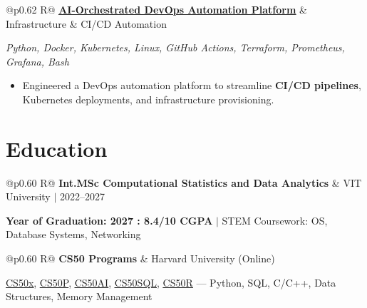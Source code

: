 \documentclass[a4paper,10pt]{article}
\newcommand{\ulink}[2]{\href{#1}{\uline{#2}}}
\newcommand{\subheading}[1]{{\color[HTML]{0A0A0A}\fontsize{12}{14}\selectfont\bfseries #1}}
\newcommand{\techstack}[1]{{\color[HTML]{5C5C5C}\fontsize{10.5}{12.5}\selectfont\itshape #1}}
\newcommand{\meta}[1]{{\color[HTML]{5C5C5C}\fontsize{10.5}{12.5}\selectfont #1}}
\begin{document}
\begin{tabularx}{\linewidth}{@{}p{0.62\linewidth} R@{}}
\subheading{\ulink{https://github.com/su-jin1425/AI-DevOps-Agent}{AI-Orchestrated DevOps Automation Platform}} & \meta{Infrastructure \& CI/CD Automation}
\end{tabularx}
\vspace{1pt}
\techstack{Python, Docker, Kubernetes, Linux, GitHub Actions, Terraform, Prometheus, Grafana, Bash}
\begin{itemize}[nosep, leftmargin=1.5em, itemsep=1pt, topsep=2pt]
  \item {\color[HTML]{0A0A0A}\fontsize{11}{14}\selectfont Engineered a DevOps automation platform to streamline \textbf{CI/CD pipelines}, Kubernetes deployments, and infrastructure provisioning.}
\end{itemize}

\vspace{2pt}

\section{Education}
\vspace{2pt}

\begin{tabularx}{\linewidth}{@{}p{0.60\linewidth} R@{}}
\subheading{Int.MSc Computational Statistics and Data Analytics} & \meta{VIT University $|$ 2022--2027}
\end{tabularx}
\vspace{1pt}
{\color[HTML]{3A3A3A}\fontsize{11}{14}\selectfont \textbf{Year of Graduation: 2027 : 8.4/10 CGPA} $|$ STEM Coursework: OS, Database Systems, Networking}

\begin{tabularx}{\linewidth}{@{}p{0.60\linewidth} R@{}}
\subheading{CS50 Programs} & \meta{Harvard University (Online)}
\end{tabularx}
\vspace{1pt}
{\color[HTML]{3A3A3A}\fontsize{11}{14}\selectfont \ulink{https://cs50.harvard.edu/certificates/b14b78df-e05c-413e-a607-1dd27303053a}{CS50x}, \ulink{https://cs50.harvard.edu/certificates/32477052-9db4-49c4-a5a4-d7e58429ca2c}{CS50P}, \ulink{https://cs50.harvard.edu/certificates/9cdb4d4a-1250-4f8e-9fd7-191864e0f919}{CS50AI}, \ulink{https://cs50.harvard.edu/certificates/bc486f24-f085-4e61-8536-80940b97a1b9}{CS50SQL}, \ulink{https://cs50.harvard.edu/certificates/666838e6-a053-4d82-b179-a60fe745fd84}{CS50R} --- Python, SQL, C/C++, Data Structures, Memory Management}
\end{document}
